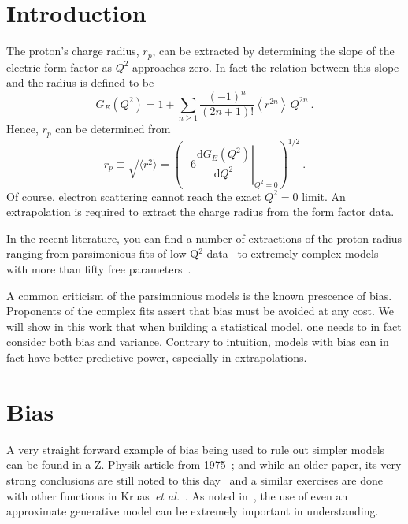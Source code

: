 \documentclass[10pt,aps,prc,twocolumn]{revtex4-1}
\begin{document}
\maketitle

\section{Introduction}


The proton's charge radius, $r_p$, can be extracted
by determining the slope of the electric form factor as $Q^2$
approaches zero.  In fact the relation between this slope and 
the radius is defined to be
$$
G_E(Q^2)
   =  1
   +  \sum_{n\ge 1} \frac{(-1)^n}{(2n+1)!}
      \left\langle r^{2n} \right\rangle \, Q^{2n} \>.
$$
Hence, $r_p$ can be determined from
$$
  r_p \equiv \sqrt{ \langle r^2 \rangle}
   = \left( -6  \left. \frac{\mathrm{d} G_E(Q^2)}{\mathrm{d}Q^2}
    \right|_{Q^{2}=0} \right)^{1/2} \>.
 $$
Of course, electron scattering cannot reach the exact $Q^2 = 0$ limit.
An extrapolation is required to extract the charge radius from the form factor data.

In the recent literature, you can find a number of extractions of the proton radius ranging from
parsimonious fits of low Q$^2$ data~\cite{Griffioen:2015hta,Horbatsch:2016ilr,Higinbotham:2015rja} to extremely 
complex models with more than fifty free parameters~\cite{}.

A common criticism of the parsimonious models is the known prescence of bias. 
Proponents of the complex fits assert that bias must be avoided at any cost. 
We will show in this work that when building a statistical model, one needs to in fact consider both bias and variance.
Contrary to intuition, models with bias can in fact have better predictive power, especially in extrapolations.

\section{Bias}

A very straight forward example of bias being used to rule out simpler models can be found in a Z. Physik
article from 1975~\cite{Borkowski:1975}; and while an older paper, its very strong conclusions are still 
noted to this day~\cite{Sick:2017aor} and a similar exercises are done with other functions in Kruas~\textit{et al.}~\cite{Kraus:2014qua}.
As noted in~\cite{Hogg:2010yz}, the use of even an approximate generative model can be extremely important in understanding. %
\end{document}
